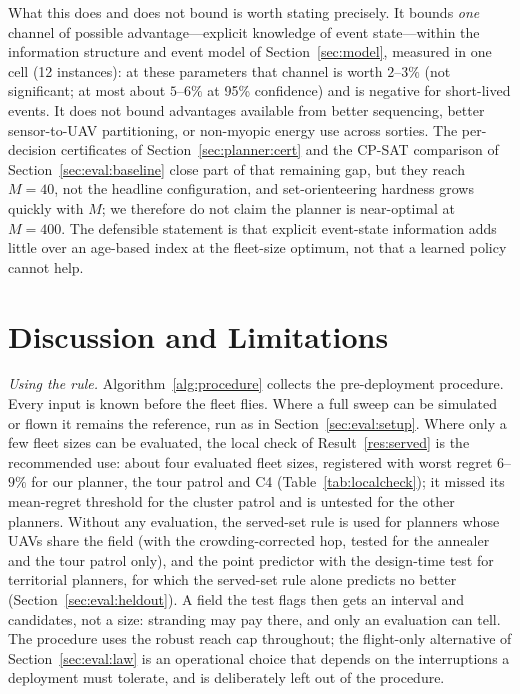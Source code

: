 \documentclass[journal,outdir=./]{IEEEtran}
\begin{document}
What this does and does not bound is worth stating precisely. It bounds \emph{one} channel of possible advantage---explicit knowledge of event state---within the information structure and event model of Section~\ref{sec:model}, measured in one cell (12 instances): at these parameters that channel is worth $2$--$3\%$ (not significant; at most about $5$--$6\%$ at 95\% confidence) and is negative for short-lived events. It does not bound advantages available from better sequencing, better sensor-to-UAV partitioning, or non-myopic energy use across sorties. The per-decision certificates of Section~\ref{sec:planner:cert} and the CP-SAT comparison of Section~\ref{sec:eval:baseline} close part of that remaining gap, but they reach $M=40$, not the headline configuration, and set-orienteering hardness grows quickly with $M$; we therefore do not claim the planner is near-optimal at $M=400$. The defensible statement is that explicit event-state information adds little over an age-based index at the fleet-size optimum, not that a learned policy cannot help.

\section{Discussion and Limitations}\label{sec:disc}
\textit{Using the rule.} Algorithm~\ref{alg:procedure} collects the pre-deployment procedure. Every input is known before the fleet flies. Where a full sweep can be simulated or flown it remains the reference, run as in Section~\ref{sec:eval:setup}. Where only a few fleet sizes can be evaluated, the local check of Result~\ref{res:served} is the recommended use: about four evaluated fleet sizes, registered with worst regret $6$--$9\%$ for our planner, the tour patrol and C4 (Table~\ref{tab:localcheck}); it missed its mean-regret threshold for the cluster patrol and is untested for the other planners. Without any evaluation, the served-set rule is used for planners whose UAVs share the field (with the crowding-corrected hop, tested for the annealer and the tour patrol only), and the point predictor with the design-time test for territorial planners, for which the served-set rule alone predicts no better (Section~\ref{sec:eval:heldout}). A field the test flags then gets an interval and candidates, not a size: stranding may pay there, and only an evaluation can tell. The procedure uses the robust reach cap throughout; the flight-only alternative of Section~\ref{sec:eval:law} is an operational choice that depends on the interruptions a deployment must tolerate, and is deliberately left out of the procedure.
\end{document}
